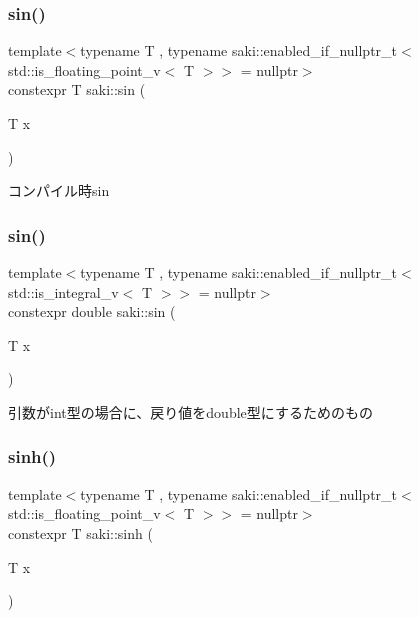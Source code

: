 \subsubsection{\texorpdfstring{sin()}{sin()}\hspace{0.1cm}{\footnotesize\ttfamily [1/2]}}
{\footnotesize\ttfamily template$<$typename T , typename saki\+::enabled\+\_\+if\+\_\+nullptr\+\_\+t$<$ std\+::is\+\_\+floating\+\_\+point\+\_\+v$<$ T $>$$>$  = nullptr$>$ \\
constexpr T saki\+::sin (\begin{DoxyParamCaption}\item[{T}]{x }\end{DoxyParamCaption})}



コンパイル時sin 

\mbox{\label{namespacesaki_a9fd77d1e52189e28f4a5d069891501cf}} 
\subsubsection{\texorpdfstring{sin()}{sin()}\hspace{0.1cm}{\footnotesize\ttfamily [2/2]}}
{\footnotesize\ttfamily template$<$typename T , typename saki\+::enabled\+\_\+if\+\_\+nullptr\+\_\+t$<$ std\+::is\+\_\+integral\+\_\+v$<$ T $>$$>$  = nullptr$>$ \\
constexpr double saki\+::sin (\begin{DoxyParamCaption}\item[{T}]{x }\end{DoxyParamCaption})}



引数がint型の場合に、戻り値をdouble型にするためのもの 

\mbox{\label{namespacesaki_abe1ef6db83d59a5eb2daac9bff09d312}} 
\subsubsection{\texorpdfstring{sinh()}{sinh()}\hspace{0.1cm}{\footnotesize\ttfamily [1/2]}}
{\footnotesize\ttfamily template$<$typename T , typename saki\+::enabled\+\_\+if\+\_\+nullptr\+\_\+t$<$ std\+::is\+\_\+floating\+\_\+point\+\_\+v$<$ T $>$$>$  = nullptr$>$ \\
constexpr T saki\+::sinh (\begin{DoxyParamCaption}\item[{T}]{x }\end{DoxyParamCaption})}



